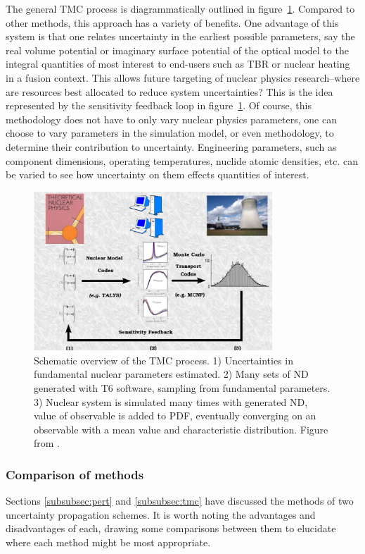 The general TMC process is diagrammatically outlined in figure~\ref{fig:tmc_overview}. Compared to other methods, this approach has a variety of benefits. One advantage of this system is that one relates uncertainty in the earliest possible parameters, say the real volume potential or imaginary surface potential of the optical model to the integral quantities of most interest to end-users such as TBR or nuclear heating in a fusion context. This allows future targeting of nuclear physics research--where are resources best allocated to reduce system uncertainties? This is the idea represented by the sensitivity feedback loop in figure~\ref{fig:tmc_overview}. Of course, this methodology does not have to only vary nuclear physics parameters, one can choose to vary parameters in the simulation model, or even methodology, to determine their contribution to uncertainty. Engineering parameters, such as component dimensions, operating temperatures, nuclide atomic densities, etc. can be varied to see how uncertainty on them effects quantities of interest.

\begin{figure}
  \centering
  \includegraphics[width=0.8\textwidth]{tmc_overview.png}
  \caption{Schematic overview of the TMC process. 1) Uncertainties in fundamental nuclear parameters estimated. 2) Many sets of ND generated with T6 software, sampling from fundamental parameters. 3) Nuclear system is simulated many times with generated ND, value of observable is added to PDF, eventually converging on an observable with a mean value and characteristic distribution. Figure from \cite{Koning2008}.}
  \label{fig:tmc_overview}
\end{figure}

\FloatBarrier
\subsubsection{Comparison of methods}
Sections \ref{subsubsec:pert} and \ref{subsubsec:tmc} have discussed the methods of two uncertainty propagation schemes. It is worth noting the advantages and disadvantages of each, drawing some comparisons between them to elucidate where each method might be most appropriate.

